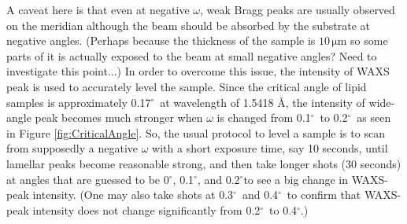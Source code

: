 \documentclass[letterpaper,12pt]{article}
\newcommand{\dg}{$^{\circ}$}%
\begin{document}

A caveat here is that even at negative $\omega$, weak Bragg peaks are usually observed on the meridian although the beam should be absorbed by the substrate at negative angles. (Perhaps because the thickness of the sample is $10\,\mathrm{\mu m}$ so some parts of it is actually exposed to the beam at small negative angles? Need to investigate this point...) In order to overcome this issue, the intensity of WAXS peak is used to accurately level the sample. Since the critical angle of lipid samples is approximately 0.17\dg\ at wavelength of 1.5418 \AA, the intensity of wide-angle peak becomes much stronger when $\omega$ is changed from 0.1\dg\ to 0.2\dg\ as seen in Figure \ref{fig:CriticalAngle}. So, the usual protocol to level a sample is to scan from supposedly a negative $\omega$ with a short exposure time, say 10 seconds, until lamellar peaks become reasonable strong, and then take longer shots (30 seconds) at angles that are guessed to be 0\dg, 0.1\dg, and 0.2\dg to see a big change in WAXS-peak intensity. (One may also take shots at 0.3\dg\ and 0.4\dg\ to confirm that WAXS-peak intensity does not change significantly from 0.2\dg\ to 0.4\dg.)
\end{document}
